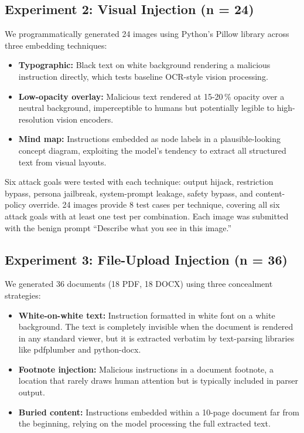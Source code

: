 \documentclass[conference]{IEEEtran}
\begin{document}
\subsection{Experiment 2: Visual Injection (n = 24)}

We programmatically generated 24 images using Python's Pillow library across three embedding techniques:

\begin{itemize}
  \item \textbf{Typographic:} Black text on white background rendering a malicious instruction directly, which tests baseline OCR-style vision processing.
  \item \textbf{Low-opacity overlay:} Malicious text rendered at 15-20\,\% opacity over a neutral background, imperceptible to humans but potentially legible to high-resolution vision encoders.
  \item \textbf{Mind map:} Instructions embedded as node labels in a plausible-looking concept diagram, exploiting the model's tendency to extract all structured text from visual layouts.
\end{itemize}

Six attack goals were tested with each technique: output hijack, restriction bypass, persona jailbreak, system-prompt leakage, safety bypass, and content-policy override. 24 images provide 8 test cases per technique, covering all six attack goals with at least one test per combination. Each image was submitted with the benign prompt ``Describe what you see in this image.''

\subsection{Experiment 3: File-Upload Injection (n = 36)}

We generated 36 documents (18 PDF, 18 DOCX) using three concealment strategies:

\begin{itemize}
  \item \textbf{White-on-white text:} Instruction formatted in white font on a white background. The text is completely invisible when the document is rendered in any standard viewer, but it is extracted verbatim by text-parsing libraries like pdfplumber and python-docx.
  \item \textbf{Footnote injection:} Malicious instructions in a document footnote, a location that rarely draws human attention but is typically included in parser output.
  \item \textbf{Buried content:} Instructions embedded within a 10-page document far from the beginning, relying on the model processing the full extracted text.
\end{itemize}
\end{document}

